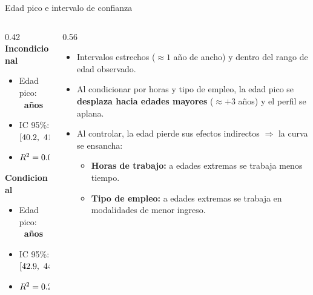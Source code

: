 \documentclass[aspectratio=169]{beamer}
\begin{document}
\begin{frame}{Edad pico e intervalo de confianza}
  \begin{columns}[T]
    \begin{column}{0.42\textwidth}
      \textcolor{specuncond}{\textbf{Incondicional}}
      \begin{itemize}
        \item Edad pico: \textbf{\AgePeakUncond\ años}
        \item IC 95\%: $[\AgePeakUncondLo,\ \AgePeakUncondHi]$
        \item $R^2 = 0.052$
      \end{itemize}
      \vspace{0.6em}
      \textcolor{speccond}{\textbf{Condicional}}
      \begin{itemize}
        \item Edad pico: \textbf{\AgePeakCond\ años}
        \item IC 95\%: $[\AgePeakCondLo,\ \AgePeakCondHi]$
        \item $R^2 = 0.227$
      \end{itemize}
    \end{column}
    \begin{column}{0.56\textwidth}
      \begin{itemize}
        \item Intervalos estrechos ($\approx 1$ año de ancho) y dentro del rango de edad observado.
        \item Al condicionar por horas y tipo de empleo, la edad pico se
          \textbf{desplaza hacia edades mayores} ($\approx +3$ años) y el perfil
          se aplana.
        \item Al controlar, la edad pierde sus efectos indirectos $\Rightarrow$ la curva se ensancha:
          \begin{itemize}
            \item \textbf{Horas de trabajo:} a edades extremas se trabaja menos tiempo.
            \item \textbf{Tipo de empleo:} a edades extremas se trabaja en modalidades de menor ingreso.
          \end{itemize}
      \end{itemize}
    \end{column}
  \end{columns}
\end{frame}
\end{document}
